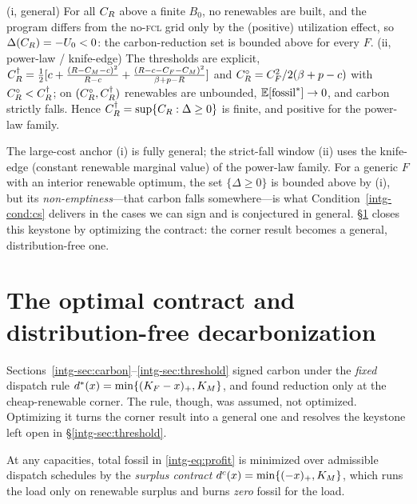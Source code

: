 \begin{theorem}\label{intg-thm:threshold}
\textup{(i, general)} For all $C_R$ above a finite $B_0$, no renewables are built,
and the program differs from the no-\textsc{fcl} grid only by the (positive)
utilization effect, so $\Delta(C_R)=-U_0<0$: the carbon-reduction set is bounded
above for every $F$. \textup{(ii, power-law / knife-edge)} The thresholds are
explicit,
$C_R^{\dagger}=\tfrac12[c+\tfrac{(R-C_M-c)^2}{R-c}+\tfrac{(R-c-C_F-C_M)^2}{\beta+p-R}]$
and $C_R^{\circ}=C_F^2/2(\beta+p-c)$ with $C_R^{\circ}<C_R^{\dagger}$; on
$(C_R^{\circ},C_R^{\dagger})$ renewables are unbounded, $\mathbb{E}[\text{fossil}^{*}]\to0$,
and carbon strictly falls. Hence $C_R^{\dagger}=\sup\{C_R:\Delta\ge0\}$ is finite,
and positive for the power-law family.
\end{theorem}

The large-cost anchor (i) is fully general; the strict-fall window (ii) uses the
knife-edge (constant renewable marginal value) of the power-law family. For a
generic $F$ with an interior renewable optimum, the set $\{\Delta\ge0\}$ is bounded
above by (i), but its \emph{non-emptiness}---that carbon falls somewhere---is what
Condition~\ref{intg-cond:cs} delivers in the cases we can sign and is conjectured in
general. \S\ref{intg-sec:optcontract} closes this keystone by optimizing the contract:
the corner result becomes a general, distribution-free one.

\section{The optimal contract and distribution-free decarbonization}\label{intg-sec:optcontract}

Sections~\ref{intg-sec:carbon}--\ref{intg-sec:threshold} signed carbon under the \emph{fixed}
dispatch rule $d^{*}(x)=\min\{(K_F-x)_+,K_M\}$, and found reduction only at the
cheap-renewable corner. The rule, though, was assumed, not optimized. Optimizing it
turns the corner result into a general one and resolves the keystone left open in
\S\ref{intg-sec:threshold}.

\begin{proposition}\label{intg-prop:surplus}
At any capacities, total fossil in \eqref{intg-eq:profit} is minimized over admissible
dispatch schedules by the \emph{surplus contract} $d^{c}(x)=\min\{(-x)_+,K_M\}$, which
runs the load only on renewable surplus and burns \emph{zero} fossil for the load.
\end{proposition}

